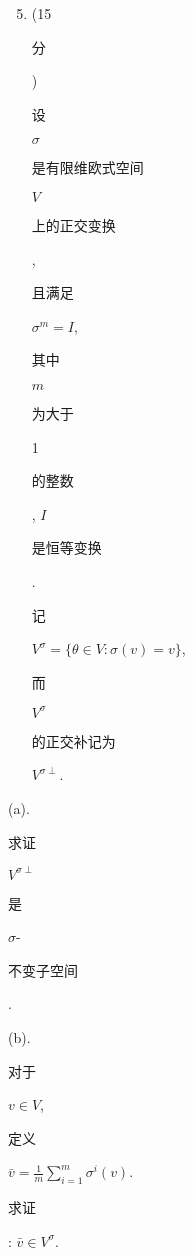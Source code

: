 \documentclass[10pt]{article}
\begin{document}
\begin{enumerate}
  \setcounter{enumi}{4}
  \item (15 \begin{CJK}{UTF8}{mj}分\end{CJK}) \begin{CJK}{UTF8}{mj}设\end{CJK} $\sigma$ \begin{CJK}{UTF8}{mj}是有限维欧式空间\end{CJK} $V$ \begin{CJK}{UTF8}{mj}上的正交变换\end{CJK}, \begin{CJK}{UTF8}{mj}且满足\end{CJK} $\sigma^{m}=I$, \begin{CJK}{UTF8}{mj}其中\end{CJK} $m$ \begin{CJK}{UTF8}{mj}为大于\end{CJK} 1 \begin{CJK}{UTF8}{mj}的整数\end{CJK}, $I$ \begin{CJK}{UTF8}{mj}是恒等变换\end{CJK}. \begin{CJK}{UTF8}{mj}记\end{CJK} $V^{\sigma}=\{\theta \in V: \sigma(v)=v\}$, \begin{CJK}{UTF8}{mj}而\end{CJK} $V^{\sigma}$ \begin{CJK}{UTF8}{mj}的正交补记为\end{CJK} $V^{\sigma \perp}$.
\end{enumerate}
(a). \begin{CJK}{UTF8}{mj}求证\end{CJK} $V^{\sigma \perp}$ \begin{CJK}{UTF8}{mj}是\end{CJK} $\sigma$-\begin{CJK}{UTF8}{mj}不变子空间\end{CJK}.

(b). \begin{CJK}{UTF8}{mj}对于\end{CJK} $v \in V$, \begin{CJK}{UTF8}{mj}定义\end{CJK} $\bar{v}=\frac{1}{m} \sum_{i=1}^{m} \sigma^{i}(v)$. \begin{CJK}{UTF8}{mj}求证\end{CJK}: $\bar{v} \in V^{\sigma}$.
\end{document}
